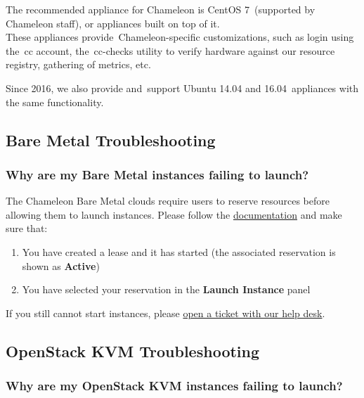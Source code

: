 The recommended appliance for Chameleon is CentOS 7~(supported by
Chameleon staff), or appliances built on top of it.\\
These appliances provide~Chameleon-specific customizations, such as
login using the~cc account, the~cc-checks utility to verify hardware
against our resource registry, gathering of metrics, etc.

Since 2016, we also provide and~support Ubuntu 14.04 and
16.04~appliances with the same functionality.

\subsection{Bare Metal Troubleshooting}\label{bare-metal-troubleshooting}

\subsubsection{Why are my Bare Metal instances failing to
launch?}\label{why-are-my-bare-metal-instances-failing-to-launch}

The Chameleon Bare Metal clouds require users to reserve resources
before allowing them to launch instances. Please follow the
\href{https://www.chameleoncloud.org/docs/bare-metal/}{documentation}
and make sure that:

\begin{enumerate}
\item
  You have created a lease and it has started (the associated
  reservation is shown as \textbf{Active})
\item
  You have selected your reservation in the \textbf{Launch Instance}
  panel
\end{enumerate}

If you still cannot start instances, please
\href{https://www.chameleoncloud.org/user/help/}{open a ticket with our
help desk}.

\subsection{OpenStack KVM Troubleshooting}\label{openstack-kvm-troubleshooting}

\subsubsection{Why are my OpenStack KVM instances failing to
launch?}\label{why-are-my-openstack-kvm-instances-failing-to-launch}

